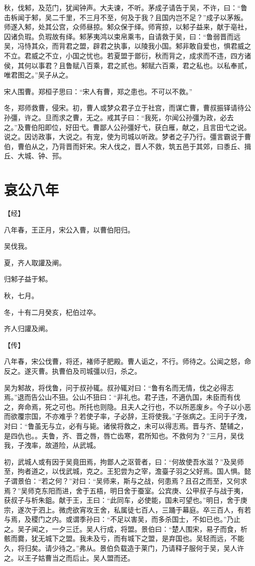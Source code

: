 \documentclass[a4paper,12pt,UTF8,twoside]{ctexbook}
\begin{document}
秋，伐邾，及范门，犹闻钟声。大夫谏，不听。茅成子请告于吴，不许，曰：“鲁击柝闻于邾，吴二千里，不三月不至，何及于我？且国内岂不足？”成子以茅叛。师遂入邾，处其公宫，众师昼掠。邾众保于绎。师宵掠，以邾子益来，献于亳社，囚诸负瑕。负瑕故有绎。邾茅夷鸿以束帛乘韦，自请救于吴，曰：“鲁弱晋而远吴，冯恃其众，而背君之盟，辟君之执事，以陵我小国。邾非敢自爱也，惧君威之不立。君威之不立，小国之忧也。若夏盟于鄫衍，秋而背之，成求而不违，四方诸侯，其何以事君？且鲁赋八百乘，君之贰也。邾赋六百乘，君之私也。以私奉贰，唯君图之。”吴子从之。

宋人围曹。郑桓子思曰：“宋人有曹，郑之患也。不可以不救。”

冬，郑师救曹，侵宋。初，曹人或梦众君子立于社宫，而谋亡曹，曹叔振铎请待公孙彊，许之。旦而求之曹，无之。戒其子曰：“我死，尔闻公孙彊为政，必去之。”及曹伯阳即位，好田弋。曹鄙人公孙彊好弋，获白雁，献之，且言田弋之说。说之。因访政事，大说之。有宠，使为司城以听政。梦者之子乃行。彊言霸说于曹伯，曹伯从之，乃背晋而奸宋。宋人伐之，晋人不救，筑五邑于其郊，曰黍丘、揖丘、大城、钟、邘。


\chapter{哀公八年}



【经】

八年春，王正月，宋公入曹，以曹伯阳归。

吴伐我。

夏，齐人取讙及阐。

归邾子益于邾。

秋，七月。

冬，十有二月癸亥，杞伯过卒。

齐人归讙及阐。

【传】

八年春，宋公伐曹，将还，褚师子肥殿。曹人诟之，不行。师待之。公闻之怒，命反之。遂灭曹。执曹伯及司城彊以归，杀之。

吴为邾故，将伐鲁，问于叔孙辄。叔孙辄对曰：“鲁有名而无情，伐之必得志焉。”退而告公山不狃。公山不狃曰：“非礼也。君子违，不適仇国，未臣而有伐之，奔命焉，死之可也。所托也则隐。且夫人之行也，不以所恶废乡。今子以小恶而欲覆宗国，不亦难乎？若使子率，子必辞，王将使我。”子张病之。王问于子洩，对曰：“鲁虽无与立，必有与毙。诸侯将救之，未可以得志焉。晋与齐、楚辅之，是四仇也。。夫鲁，齐、晋之唇，唇亡齿寒，君所知也。不救何为？”三月，吴伐我，子洩率，故道险，从武城。

初，武城人或有因于吴竟田焉，拘鄫人之沤菅者，曰：“何故使吾水滋？”及吴师至，拘者道之，以伐武城，克之。王犯尝为之宰，澹臺子羽之父好焉。国人惧。懿子谓景伯：“若之何？”对曰：“吴师来，斯与之战，何患焉？且召之而至，又何求焉？”吴师克东阳而进，舍于五梧，明日舍于蚕室。公宾庚、公甲叔子与战于夷，获叔子与析朱鉏。献于王，王曰：“此同车，必使能，国未可望也。”明日，舍于庚宗，遂次于泗上。微虎欲宵攻王舍，私属徒七百人，三踊于幕庭。卒三百人，有若与焉，及稷门之内。或谓季孙曰：“不足以害吴，而多杀国士，不如已也。”乃止之。吴子闻之，一夕三迁。吴人行成，将盟。景伯曰：“楚人围宋，易子而食，析骸而爨，犹无城下之盟。我未及亏，而有城下之盟，是弃国也。吴轻而远，不能久，将归矣。请少待之。”弗从。景伯负载造于莱门，乃请释子服何于吴，吴人许之。以王子姑曹当之而后止。吴人盟而还。
\end{document}
